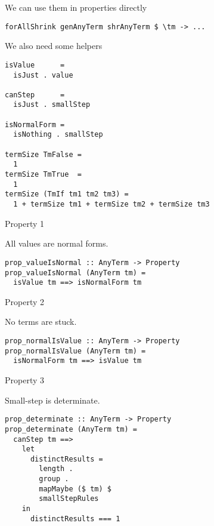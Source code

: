 \documentclass[aspectration=169]{beamer}
\begin{document}
\begin{frame}[fragile]
  \begin{center}
  We can use them in properties directly
  \end{center}
  \begin{verbatim}
forAllShrink genAnyTerm shrAnyTerm $ \tm -> ...
  \end{verbatim}
\end{frame}

\begin{frame}[fragile]
  We also need some helpers
  \begin{verbatim}
isValue      = 
  isJust . value

canStep      =
  isJust . smallStep

isNormalForm = 
  isNothing . smallStep

termSize TmFalse = 
  1
termSize TmTrue  =
  1
termSize (TmIf tm1 tm2 tm3) = 
  1 + termSize tm1 + termSize tm2 + termSize tm3
  \end{verbatim}
\end{frame}

\begin{frame}[fragile]
  Property 1
  \begin{center}
All values are normal forms.
  \end{center}
  \begin{verbatim}
prop_valueIsNormal :: AnyTerm -> Property
prop_valueIsNormal (AnyTerm tm) =
  isValue tm ==> isNormalForm tm
  \end{verbatim}
\end{frame}

\begin{frame}[fragile]
  Property 2
  \begin{center}
No terms are stuck.
  \end{center}
  \begin{verbatim}
prop_normalIsValue :: AnyTerm -> Property
prop_normalIsValue (AnyTerm tm) =
  isNormalForm tm ==> isValue tm
  \end{verbatim}
\end{frame}

\begin{frame}[fragile]
  Property 3
  \begin{center}
Small-step is determinate.
  \end{center}
  \begin{verbatim}
prop_determinate :: AnyTerm -> Property
prop_determinate (AnyTerm tm) =
  canStep tm ==>
    let
      distinctResults =
        length .
        group .
        mapMaybe ($ tm) $
        smallStepRules
    in
      distinctResults === 1
  \end{verbatim}
\end{frame}
\end{document}
